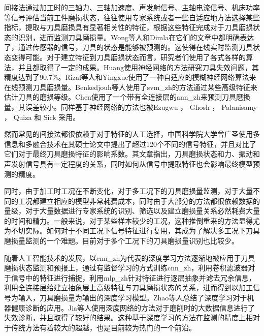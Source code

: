 间接法通过加工时的三轴力\cite{dimla2000line,saglam2003tool}、三轴加速度\cite{polini2007monitoring,yesilyurt2007tool,lin1996tool,fu2011cutting,zhang2008tool}、声发射信号\cite{dimla2000sensor}、主轴电流信号\cite{kim2011fuzzy}、机床功率\cite{drouillet2016tool}等信号评估当前工件磨损状态，往往使用专家系统或者一些自适应地方法选择某些指标，提取与刀具磨损具有显著相关性的特征，根据这些特征完成对于刀具磨损状态的识别，进而监测刀具磨损量。Wong\cite{wong2004experimental}等人和Dimla\cite{dimla2000sensor}在它们的文章中都明确表达了，通过传感器的信号，刀具的状态是能够被预测的。这使得在线实时监测刀具状态变得可能。对于建立特征到刀具磨损状态而言，研究者们使用了各式各样的算法，并且都取得了一定的成果。Huang\cite{huang2000neural}使用神经网络的方法研究刀具失效问题，其精度达到了90.7\%。Rizal等人\cite{rizal2013online}和Yingxue\cite{yao1999tool}使用了一种自适应的模糊神经网络算法来在线预测刀具磨损量。Benkedjouh等人\cite{benkedjouh2015health}使用了\gls{svm_zh}的方法通过某些高级特征来估计刀具的磨损等级。Chen\cite{chen2005artificial}使用了一个带有全连接层的\gls{ann_zh}来预测刀具磨损量，其误差较小。同样基于神经网络的方法也被Ezugwu \cite{ezugwu1995tool}， Ghosh \cite{ghosh2007estimation}， Palanisamy \cite{palanisamy2008prediction}， Quiza \cite{quiza2008comparing} 和 Sick \cite{sick2002line}采用。

然而常见的间接法都很依赖于对于特征的人工选择，中国科学院大学曾广圣使用多信息和多融合技术\cite{曾广圣2017基于多信息和多模型融合的刀具磨损预测性评估的方法研究}在其硕士论文中提出了超过120个不同的信号特征，并且对比了它们对于最终刀具磨损特征的影响系数。其文章指出，刀具磨损状态和力、振动和声发射信号具有一定程度的关系，同时如何从信号中提取特征也会影响最终模型预测的精度。

同时，由于加工时工况在不断变化，对于多工况下的刀具磨损量监测，对于大量不同的工况都建立相应的模型非常耗费成本，同时由于大部分的方法都很依赖数据的量级，对于大量数据进行专家系统的识别、筛选以及建立磨损量关系必然耗费大量的时间和精力。一般来说，对于某些样本较少的工况，这种推倒重来的方法显得尤为不切实际。如何对于不同工况下信号特征进行复用，其成为了解决多工况下刀具磨损量监测的一个难题。目前对于多个工况下的刀具磨损量识别也比较少。

随着人工智能技术的发展，以\gls{cnn_zh}为代表的深度学习方法逐渐地被应用于刀具磨损状态监测和预报上，通过有监督学习的方式训练\gls{cnn_zh}，利用卷积滤波器对于信号中的特征进行捕捉，利用\gls{mlp_zh}针对特征进行逐层抽象并滤去冗余信息，利用全连接层给建立抽象层上高级特征与刀具磨损状态的关系，进而得到以加工信号为输入，刀具磨损量为输出的深度学习模型。Zhao等人\cite{zhao2019deep}总结了深度学习对于机器健康诊断的应用。Jia等人\cite{jia2016deep}使用深度网络的方法对于磨削时的大数据信息进行了失效诊断，并且取得了较好的结果。这种基于深度学习的方法在监测的精度上相对于传统方法有着较大的超越，也是目前较为热门的一个前沿。

